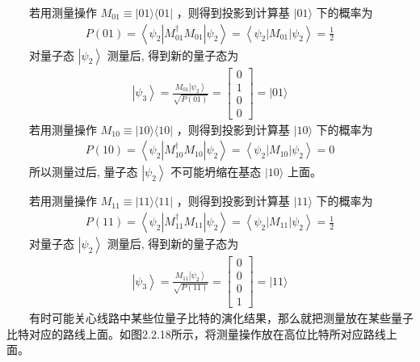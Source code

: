\documentclass[a4paper,11pt,english]{sphinxmanual}
\begin{document}
\sphinxAtStartPar
  若用测量操作 \(M_{01} \equiv|01\rangle\langle 01|\) ，则得到投影到计算基 \(|01\rangle\) 下的概率为
\begin{equation*}
\begin{split}P(01)=\left\langle\psi_{2}\left|M_{01}^{\dagger} M_{01}\right| \psi_{2}\right\rangle=\left\langle\psi_{2}\left|M_{01}\right| \psi_{2}\right\rangle=\frac{1}{2}\end{split}
\end{equation*}
\sphinxAtStartPar
  对量子态 \(\left|\psi_{2}\right\rangle\) 测量后, 得到新的量子态为
\begin{equation*}
\begin{split}\left|\psi_{3}\right\rangle=\frac{M_{01}\left|\psi_{2}\right\rangle}{\sqrt{P(01)}}=\left[\begin{array}{l} 0 \\ 1 \\ 0 \\ 0 \end{array}\right]=|01\rangle\end{split}
\end{equation*}
\sphinxAtStartPar
  若用测量操作 \(M_{10} \equiv|10\rangle\langle 10|\) ，则得到投影到计算基 \(|10\rangle\) 下的概率为
\begin{equation*}
\begin{split}P(10)=\left\langle\psi_{2}\left|M_{10}^{\dagger} M_{10}\right| \psi_{2}\right\rangle=\left\langle\psi_{2}\left|M_{10}\right| \psi_{2}\right\rangle=0\end{split}
\end{equation*}
\sphinxAtStartPar
  所以测量过后, 量子态 \(\left|\psi_{2}\right\rangle\) 不可能坍缩在基态 \(|10\rangle\) 上面。

\sphinxAtStartPar
  若用测量操作 \(M_{11} \equiv|11\rangle\langle 11|\) ，则得到投影到计算基 \(|11\rangle\) 下的概率为
\begin{equation*}
\begin{split}P(11)=\left\langle\psi_{2}\left|M_{11}^{\dagger} M_{11}\right| \psi_{2}\right\rangle=\left\langle\psi_{2}\left|M_{11}\right| \psi_{2}\right\rangle=\frac{1}{2}\end{split}
\end{equation*}
\sphinxAtStartPar
  对量子态 \(\left|\psi_{2}\right\rangle\) 测量后, 得到新的量子态为
\begin{equation*}
\begin{split}\left|\psi_{3}\right\rangle=\frac{M_{11}\left|\psi_{2}\right\rangle}{\sqrt{P(11)}}=\left[\begin{array}{l} 0 \\ 0 \\ 0 \\ 1 \end{array}\right]=|11\rangle\end{split}
\end{equation*}
\sphinxAtStartPar
  有时可能关心线路中某些位量子比特的演化结果，那么就把测量放在某些量子比特对应的路线上面。如图2.2.18所示，将测量操作放在高位比特所对应路线上面。
\end{document}
